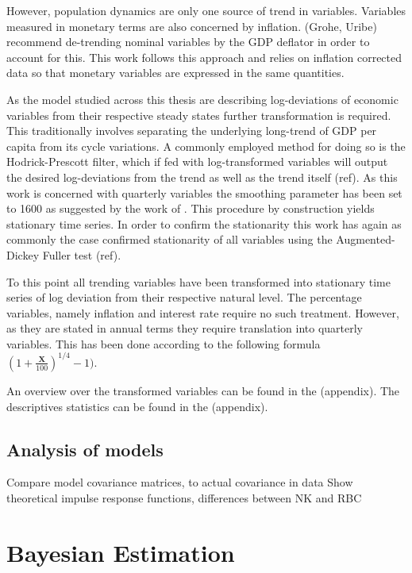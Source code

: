 \documentclass[12pt,a4paper,english]{article} %
\newcommand{\matr}[1]{\mathbf{#1}} %
\let\oldsection\section
\renewcommand\section{\clearpage\oldsection}
\begin{document}
	However, population dynamics are only one source of trend in variables. Variables measured in monetary terms are also concerned by inflation. \cite{pfeifer_guide_2021} (Grohe, Uribe) recommend de-trending nominal variables by the GDP deflator in order to account for this. This work follows this approach and relies on inflation corrected data so that monetary variables are expressed in the same quantities.
	
	As the model studied across this thesis are describing log-deviations of economic variables from their respective steady states further transformation is required. This traditionally involves separating the underlying long-trend of GDP per capita from its cycle variations. A commonly employed method for doing so is the Hodrick-Prescott filter, which if fed with log-transformed variables will output the desired log-deviations from the trend as well as the trend itself (ref). As this work is concerned with quarterly variables the smoothing parameter has been set to 1600 as suggested by the work of \cite{ravn_adjusting_2002}. This procedure by construction yields stationary time series. In order to confirm the stationarity this work has again as commonly the case confirmed stationarity of all variables using the Augmented-Dickey Fuller test (ref).
	
	To this point all trending variables have been transformed into stationary time series of log deviation from their respective natural level. The percentage variables, namely inflation and interest rate require no such treatment. However, as they are stated in annual terms they require translation into quarterly variables. This has been done according to the following formula $(1 + \frac{\matr{X}}{100})^{1/4} - 1)$.
	
	An overview over the transformed variables can be found in the (appendix).
	The descriptives statistics can be found in the (appendix).
	
	\subsection{Analysis of models}
	Compare model covariance matrices, to actual covariance in data
	Show theoretical impulse response functions, differences between NK and RBC
			
	\section{Bayesian Estimation}
		
\end{document}
